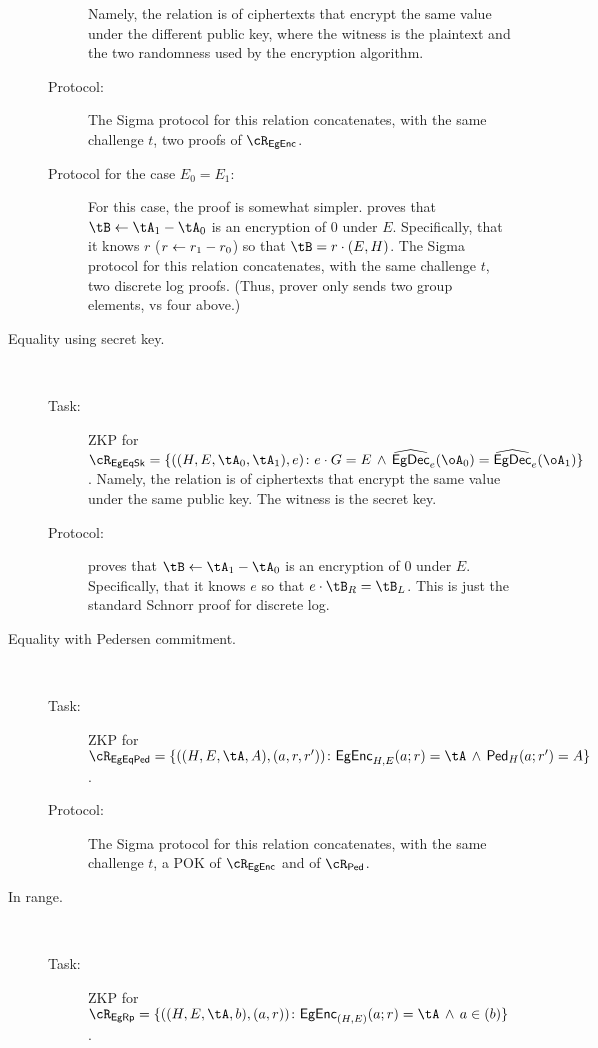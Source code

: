 \begin{description}
\begin{description}
		
		Namely, the relation  is of  ciphertexts that encrypt the  same value under the different  public key, where the witness  is the plaintext and the two randomness used by the encryption algorithm.
		
		\item[Protocol:] The Sigma protocol for this relation concatenates, with the same challenge $t$, two proofs of $\rEgEnc$. 

\item[Protocol for the case $E_0=E_1$:] For this case, the proof is somewhat simpler. \Pc proves that $\tB \asn \tA_1 - \tA_0$ is an encryption of $0$ under $E$. Specifically, that it knows $r$ (\ie $r\leftarrow r_1 -r_0$) so that  $\tB  = r\cdot (E,H)$. The Sigma protocol for this relation concatenates, with the same challenge $t$, two discrete log proofs. (Thus, prover only sends two group elements, vs four above.)        		
\end{description}


\item[Equality using secret key.]~




\begin{description}
	\item[Task:] ZKP for  $\rEgEqSk =\rEgEqSkDef$. Namely, the relation  is of  ciphertexts that encrypt the  same value under the same public key. The witness is the secret key.
	
	\item[Protocol:] \Pc proves that $\tB \asn \tA_1 - \tA_0$ is an encryption of $0$ under $E$. Specifically, that it knows $e$ so that  $e\cdot \tB_R  = \tB_L$. This is just the standard Schnorr proof for discrete log.
	
\end{description}


\item[Equality with Pedersen commitment.]~

\begin{description}
	\item[Task:] ZKP for  $\rEgEqPed =\rEgEqPedDef$.
	
	\item[Protocol:]  The Sigma protocol for this relation concatenates, with the same challenge $t$, a  POK of $\rEgEnc$ and of $\rPed$. 
\end{description}	


	\item[In range.] ~
	\begin{description}
		\item[Task:] ZKP for $\rEgRp =\rEgRpDef$.
		

\end{description}
\end{description}
